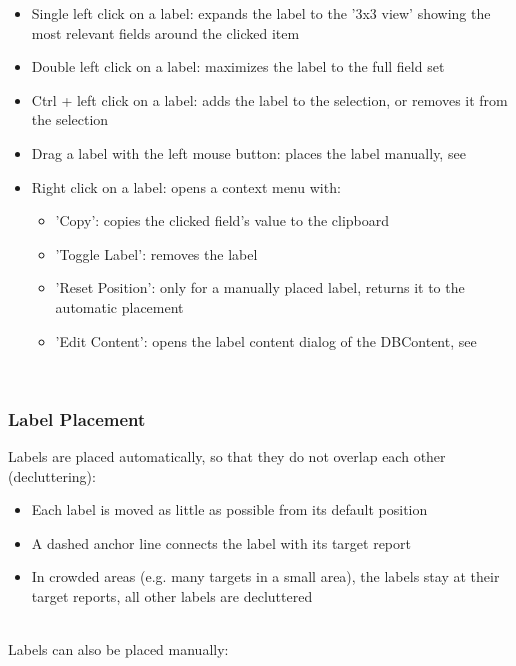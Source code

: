 \begin{itemize}
\item Single left click on a label: expands the label to the '3x3 view' showing the most relevant fields around the clicked item
\item Double left click on a label: maximizes the label to the full field set
\item Ctrl + left click on a label: adds the label to the selection, or removes it from the selection
\item Drag a label with the left mouse button: places the label manually, see 
\item Right click on a label: opens a context menu with:
\begin{itemize}
\item 'Copy': copies the clicked field's value to the clipboard
\item 'Toggle Label': removes the label
\item 'Reset Position': only for a manually placed label, returns it to the automatic placement
\item 'Edit Content': opens the label content dialog of the DBContent, see 
\end{itemize}
\end{itemize}
\ \\

\subsubsection{Label Placement}
\label{sec:geoview_label_placement}

Labels are placed automatically, so that they do not overlap each other (decluttering):

\begin{itemize}
\item Each label is moved as little as possible from its default position
\item A dashed anchor line connects the label with its target report
\item In crowded areas (e.g. many targets in a small area), the labels stay at their target reports, all other labels are decluttered
\end{itemize}
\ \\

Labels can also be placed manually:

